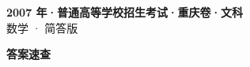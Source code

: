 \documentclass[zihao=-4, a4paper]{ctexart}
\begin{document}
\begin{center}
  {\Large\bfseries 2007 年·普通高等学校招生考试·重庆卷·文科}\\[4pt]
  {\large 数学 · 简答版}
\end{center}
\medskip
{}

\clearpage
{}
\begin{center}{\Large\bfseries 答案速查}\end{center}
\medskip

\end{document}
